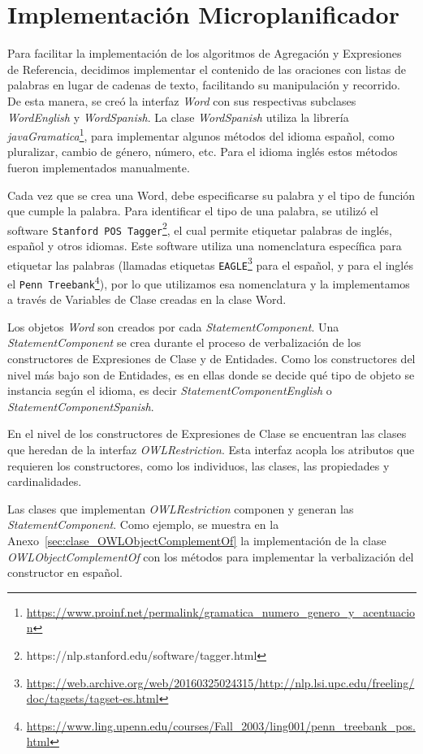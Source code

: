 \section{Implementación Microplanificador}
Para facilitar la implementación de los algoritmos de Agregación y Expresiones de Referencia, decidimos implementar el contenido de las oraciones con listas de palabras en lugar de cadenas de texto, facilitando su manipulación y recorrido. De esta manera, se creó la interfaz \emph{Word} con sus respectivas subclases \emph{WordEnglish} y \emph{WordSpanish}. 
La clase \emph{WordSpanish} utiliza la librería \emph{javaGramatica}\footnote{\url{https://www.proinf.net/permalink/gramatica_numero_genero_y_acentuacion}}, para implementar algunos métodos del idioma español, como pluralizar, cambio de género, número, etc. Para el idioma inglés estos métodos fueron implementados manualmente.

Cada vez que se crea una Word, debe especificarse su palabra y el tipo de función que cumple la palabra. Para identificar el tipo de una palabra, se utilizó el software \texttt{Stanford POS Tagger}\footnote{https://nlp.stanford.edu/software/tagger.html}, el cual permite etiquetar palabras de inglés, español y otros idiomas. Este software utiliza una nomenclatura específica para etiquetar las palabras (llamadas etiquetas \texttt{EAGLE}\footnote{\url{https://web.archive.org/web/20160325024315/http://nlp.lsi.upc.edu/freeling/doc/tagsets/tagset-es.html}} para el español, y para el inglés el \texttt{Penn Treebank}\footnote{\url{https://www.ling.upenn.edu/courses/Fall_2003/ling001/penn_treebank_pos.html}}), por lo que utilizamos esa nomenclatura y la implementamos a través de Variables de Clase creadas en la clase Word.

Los objetos \emph{Word} son creados por cada \emph{StatementComponent}. Una \emph{StatementComponent} se crea durante el proceso de verbalización de los constructores de Expresiones de Clase y de Entidades. Como los constructores del nivel más bajo son de Entidades, es en ellas donde se decide qué tipo de objeto se instancia según el idioma, es decir \emph{StatementComponentEnglish} o \emph{StatementComponentSpanish}. 

En el nivel de los constructores de Expresiones de Clase se encuentran las clases que heredan de la interfaz \emph{OWLRestriction}. Esta interfaz acopla los atributos que requieren los constructores, como los individuos, las clases, las propiedades y cardinalidades.

Las clases que implementan \emph{OWLRestriction} componen y generan las \emph{StatementComponent}. Como ejemplo, se muestra en la Anexo~\ref{sec:clase_OWLObjectComplementOf} la implementación de la clase \emph{OWLObjectComplementOf} con los métodos para implementar la verbalización del constructor en español.

